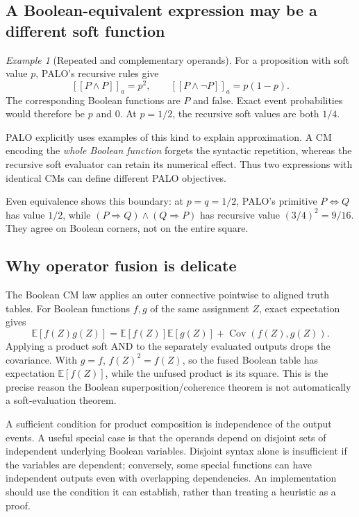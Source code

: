\documentclass[11pt,a4paper]{article}
\theoremstyle{remark}
\newtheorem{example}[proposition]{Example}
\newcommand{\E}{\mathbb E}
\newcommand{\Cov}{\operatorname{Cov}}
\newcommand{\llbracket}{[\![}
\newcommand{\rrbracket}{]\!]}
\begin{document}
\subsection{A Boolean-equivalent expression may be a different soft function}
\begin{example}[Repeated and complementary operands]
For a proposition with soft value $p$, PALO's recursive rules give
\[
 \llbracket P\wedge P\rrbracket_a=p^2,
 \qquad
 \llbracket P\wedge\neg P\rrbracket_a=p(1-p).
\]
The corresponding Boolean functions are $P$ and false. Exact event probabilities would therefore be $p$ and $0$. At $p=1/2$, the recursive soft values are both $1/4$.
\end{example}

PALO explicitly uses examples of this kind to explain approximation. A CM encoding the \emph{whole Boolean function} forgets the syntactic repetition, whereas the recursive soft evaluator can retain its numerical effect. Thus two expressions with identical CMs can define different PALO objectives.

Even equivalence shows this boundary: at $p=q=1/2$, PALO's primitive $P\Leftrightarrow Q$ has value $1/2$, while $(P\Rightarrow Q)\wedge(Q\Rightarrow P)$ has recursive value $(3/4)^2=9/16$. They agree on Boolean corners, not on the entire square.

\subsection{Why operator fusion is delicate}
The Boolean CM law applies an outer connective pointwise to aligned truth tables. For Boolean functions $f,g$ of the same assignment $Z$, exact expectation gives
\[
 \E[f(Z)g(Z)]
 =\E[f(Z)]\E[g(Z)]+\Cov(f(Z),g(Z)).
\]
Applying a product soft AND to the separately evaluated outputs drops the covariance. With $g=f$, $f(Z)^2=f(Z)$, so the fused Boolean table has expectation $\E[f(Z)]$, while the unfused product is its square. This is the precise reason the Boolean superposition/coherence theorem is not automatically a soft-evaluation theorem.

A sufficient condition for product composition is independence of the output events. A useful special case is that the operands depend on disjoint sets of independent underlying Boolean variables. Disjoint syntax alone is insufficient if the variables are dependent; conversely, some special functions can have independent outputs even with overlapping dependencies. An implementation should use the condition it can establish, rather than treating a heuristic as a proof.
\end{document}
